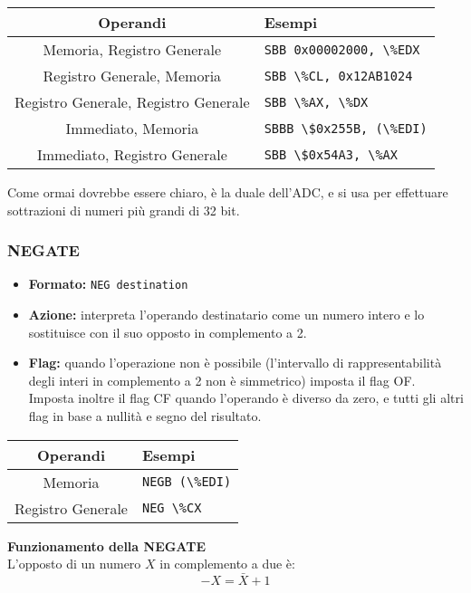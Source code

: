 \documentclass[a4paper,11pt]{article}
\begin{document}
		\begin{table}[H]
		\center {}
			\begin{tabular} { c | p{5cm} }
				\bfseries Operandi & \bfseries Esempi \\
				\hline
				Memoria, Registro Generale & \lstinline|SBB 0x00002000, \%EDX| \\ 
				Registro Generale, Memoria & \lstinline|SBB \%CL, 0x12AB1024| \\ 
				Registro Generale, Registro Generale & \lstinline|SBB \%AX, \%DX| \\ 
				Immediato, Memoria & \lstinline|SBBB \$0x255B, (\%EDI)| \\ 
				Immediato, Registro Generale & \lstinline|SBB \$0x54A3, \%AX|
			\end{tabular}
		\end{table}

Come ormai dovrebbe essere chiaro, è la duale dell'ADC, e si usa per effettuare sottrazioni di numeri più grandi di 32 bit.

\subsubsection{NEGATE}
\begin{itemize}
	\item \textbf{Formato:} \lstinline|NEG destination|
	\item \textbf{Azione:} interpreta l'operando destinatario come un numero intero e lo sostituisce con il suo opposto in complemento a 2. 
	\item \textbf{Flag:} quando l'operazione non è possibile (l'intervallo di rappresentabilità degli interi in complemento a 2 non è simmetrico) imposta il flag OF.
		Imposta inoltre il flag CF quando l'operando è diverso da zero, e tutti gli altri flag in base a nullità e segno del risultato. 
\end{itemize}

		\begin{table}[H]
		\center {}
			\begin{tabular} { c | p{5cm} }
				\bfseries Operandi & \bfseries Esempi \\
				\hline
				Memoria & \lstinline|NEGB (\%EDI)| \\ 
				Registro Generale & \lstinline|NEG \%CX|
			\end{tabular}
		\end{table}


\par\medskip
\noindent
\textbf{\textsf{Funzionamento della NEGATE}} \\
L'opposto di un numero $X$ in complemento a due è:
$$
-X = \bar{X} + 1
$$
\end{document}
